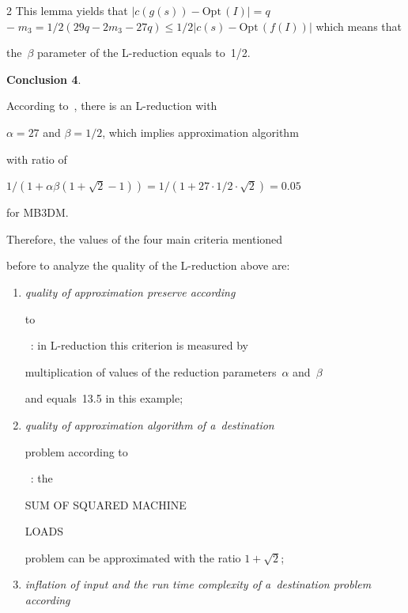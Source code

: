 \begin{multicols}{2}
This lemma yields that $|c(g(s))-\mathrm{Opt}\,(I)| = q$\linebreak $-\;m_3 =


1/2(29q-2m_3-27q) \leq 1/2|c(s)-\mathrm{Opt}\,(f(I))|$ which means that


the~$\beta$ parameter of the L-reduction equals to~1/2.





\smallskip





\noindent


\textbf{Conclusion 4}.


According to~\cite{AERW2002}, there is an L-reduction with


$\alpha=27$ and $\beta=1/2$, which implies approximation algorithm


with ratio of


$1/(1+\alpha\beta(1+\sqrt{2}-1))$\linebreak $=1/(1+27\cdot1/2\cdot\sqrt{2})=0.05$


for {MB3DM}.





\smallskip





Therefore, the values of the four main criteria mentioned


before to analyze the quality of the L-reduction above are:


\begin{enumerate}[(1)]


\item {\it quality of approximation preserve according


to}~\cite{AERW2002}: in L-reduction this criterion is measured by


multiplication of values of the reduction parameters~$\alpha$ and~$\beta$


and equals~13.5 in this example;


\item {\it quality of approximation algorithm of a~destination


problem according to}~\cite{AAGKKV}: the {SUM OF SQUARED MACHINE


LOADS} problem can be approximated with the ratio $1+\sqrt{2}$;


\item {\it inflation of input and the run time complexity of a~destination problem according


}
\end{enumerate}
\end{multicols}
